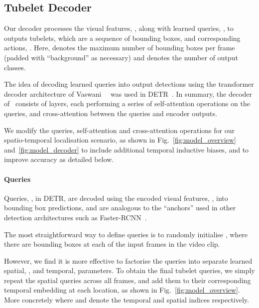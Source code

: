 \documentclass[10pt,twocolumn,letterpaper]{article}
\def \paravspace {-0.7\baselineskip}
\begin{document}
\subsection{Tubelet Decoder}
\label{sec:method_decoder}

Our decoder processes the visual features, , along with learned queries, , to outputs tubelets,  which are a sequence of bounding boxes,  and corresponding actions, .
Here,  denotes the maximum number of bounding boxes per frame (padded with ``background'' as necessary) and  denotes the number of output classes. 

The idea of decoding learned queries into output detections using the transformer decoder architecture of Vaswani~\etal~\cite{vaswani_neurips_2017} was used in DETR~\cite{carion_eccv_2020}. In summary, the decoder of~\cite{carion_eccv_2020, vaswani_neurips_2017} consists of  layers, each performing a series of self-attention operations on the queries, and cross-attention between the queries and encoder outputs.

We modify the queries, self-attention and cross-attention operations for our spatio-temporal localisation scenario, as shown in Fig.~\ref{fig:model_overview} and~\ref{fig:model_decoder} to include additional temporal inductive biases, and to improve accuracy as detailed below. 

\vspace{\paravspace}
\paragraph{Queries}
\label{sec:method_queries}

Queries, , in DETR, are decoded using the encoded visual features, , into bounding box predictions, and are analogous to the ``anchors'' used in other detection architectures such as Faster-RCNN~\cite{ren_neurips_2015}.

The most straightforward way to define queries is to randomly initialise , where there are  bounding boxes at each of the  input frames in the video clip.

However, we find it is more effective to factorise the queries into separate learned spatial, , and temporal,  parameters.
To obtain the final tubelet queries, we simply repeat the spatial queries across all frames, and add them to their corresponding temporal embedding at each location, as shown in Fig.~\ref{fig:model_overview}.
More concretely  where  and  denote the temporal and spatial indices respectively.
\end{document}

